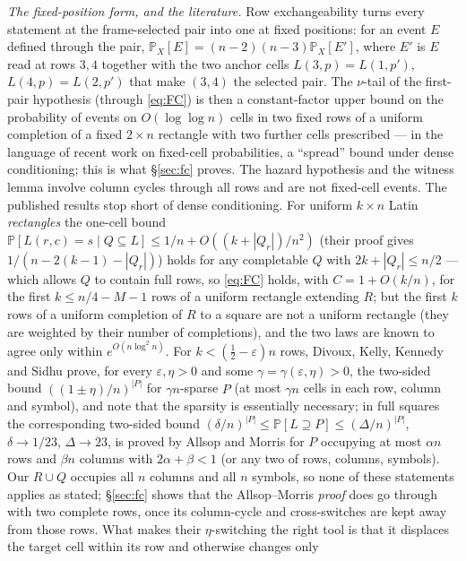 \documentclass[11pt]{article}
\theoremstyle{definition}
\renewcommand{\Pr}{\mathbb{P}}
\begin{document}
\emph{The fixed-position form, and the literature.}  Row exchangeability turns every
statement at the frame-selected pair into one at fixed positions: for an event $E$
defined through the pair, $\Pr_X[E]=(n-2)(n-3)\Pr_X[E']$, where $E'$ is $E$ read at rows
$3,4$ together with the two anchor cells $L(3,p)=L(1,p')$, $L(4,p)=L(2,p')$ that make
$(3,4)$ the selected pair.  The $\nu$-tail of the first-pair hypothesis (through
\eqref{eq:FC}) is then a constant-factor upper bound on the probability of events on
$O(\log\log n)$ cells in two fixed rows of a uniform completion of a fixed $2\times n$
rectangle with two further cells prescribed --- in the language of recent work on
fixed-cell probabilities, a ``spread'' bound under dense conditioning; this is what
\S\ref{sec:fc} proves.  The hazard hypothesis and the witness lemma involve column cycles
through all rows and are not fixed-cell events.  The published results stop short of
dense conditioning.  For uniform $k\times n$ Latin
\emph{rectangles} the one-cell bound $\Pr[L(r,c)=s\mid Q\subseteq L]\le1/n+O((k+|Q_r|)/n^2)$
(their proof gives $1/(n-2(k-1)-|Q_r|)$) holds for any completable $Q$ with
$2k+|Q_r|\le n/2$ \cite[Lemma~3.3]{KSSS23} --- which
allows $Q$ to contain full rows, so \eqref{eq:FC} holds, with $C=1+O(k/n)$, for the first
$k\le n/4-M-1$ rows of a uniform rectangle extending $R$; but the first $k$ rows of a uniform
completion of $R$ to a square are not a uniform rectangle (they are weighted by their
number of completions), and the two laws are known to agree only within
$e^{O(n\log^2n)}$.  For $k<(\tfrac12-\varepsilon)n$ rows, Divoux, Kelly, Kennedy and Sidhu
\cite[Thm.~1.6]{DKKS26} prove, for every $\varepsilon,\eta>0$ and some
$\gamma=\gamma(\varepsilon,\eta)>0$, the two-sided bound $((1\pm\eta)/n)^{|P|}$ for
$\gamma n$-sparse $P$ (at most $\gamma n$ cells in each row, column and symbol), and note
that the sparsity is essentially necessary; in full
squares the corresponding two-sided bound $(\delta/n)^{|P|}\le\Pr[L\supseteq P]\le(\Delta/n)^{|P|}$,
$\delta\to1/23$, $\Delta\to23$, is proved by Allsop and Morris \cite[Thm.~1.1]{AM26} for
$P$ occupying at most $\alpha n$ rows and $\beta n$ columns with $2\alpha+\beta<1$ (or any
two of rows, columns, symbols).  Our $R\cup Q$ occupies all $n$ columns and all $n$ symbols,
so none of these statements applies as stated; \S\ref{sec:fc} shows that the
Allsop--Morris \emph{proof} does go through with two complete rows, once its column-cycle
and cross-switches are kept away from those rows.  What makes their $\eta$-switching the
right tool is that it displaces the target cell within its row and otherwise changes only
\end{document}

